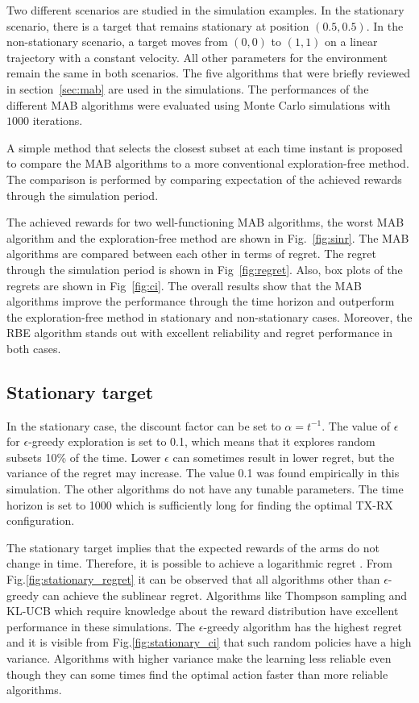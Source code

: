 \documentclass[conference]{IEEEtran}
\begin{document}
Two different scenarios are studied in the simulation examples. 
In the stationary scenario, there is a target that remains stationary at position $(0.5, 0.5)$.
In the non-stationary scenario, a target moves from $(0, 0)$ to $(1, 1)$ on a linear trajectory with a constant velocity.
All other parameters for the environment remain the same in both scenarios.
The five algorithms that were briefly reviewed in section~\ref{sec:mab} are used in the simulations.
The performances of the different MAB algorithms were evaluated using Monte Carlo simulations with $1000$ iterations.

A simple method that selects the closest subset at each time instant is proposed to compare the MAB algorithms to a more conventional exploration-free method. 
The comparison is performed by comparing expectation of the achieved rewards through the simulation period. 

The achieved rewards for two well-functioning MAB algorithms, 
the worst MAB algorithm and the exploration-free method are shown in Fig.~\ref{fig:sinr}. 
The MAB algorithms are compared between each other in terms of regret. 
The regret through the simulation period is shown in Fig~\ref{fig:regret}. 
Also, box plots of the regrets are shown in Fig~\ref{fig:ci}.
The overall results show that the MAB algorithms improve the performance through the time horizon and outperform the exploration-free method in stationary and non-stationary cases.
Moreover, the RBE algorithm stands out with excellent reliability and regret performance in both cases.

\subsection{Stationary target}

In the stationary case, the discount factor can be set to $\alpha=t^{-1}$.
The value of $\epsilon$ for $\epsilon$-greedy exploration is set to 0.1, which means that it explores random subsets 10\% of the time.
Lower $\epsilon$ can sometimes result in lower regret, but the variance of the regret may increase.
The value 0.1 was found empirically in this simulation.
The other algorithms do not have any tunable parameters.
The time horizon is set to 1000 which is sufficiently long for finding the optimal TX-RX configuration.

The stationary target implies that the expected rewards of the arms do not change in time.
Therefore, it is possible to achieve a logarithmic regret \cite{lattimorebandit}.
From Fig.\ref{fig:stationary_regret} it can be observed that all algorithms other than $\epsilon$-greedy can achieve the sublinear regret.
Algorithms like Thompson sampling and KL-UCB which require knowledge about the reward distribution have excellent performance in these simulations.
The $\epsilon$-greedy algorithm has the highest regret and it is visible from Fig.\ref{fig:stationary_ci} that such random policies have a high variance.
Algorithms with higher variance make the learning less reliable even though they can some times find the optimal action faster than more reliable algorithms.
\end{document}
